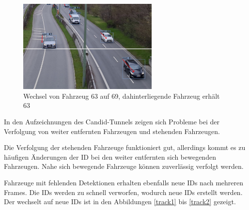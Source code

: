 \documentclass[conference]{IEEEtran}
\begin{document}
	\begin{figure}[!h]
		\begin{center}
			\includegraphics[width=7cm]{Media/switch4.jpg}
			\caption{Wechsel von Fahrzeug 63 auf 69, dahinterliegende Fahrzeug erhält 63}
			\label{track6}
		\end{center}
	\end{figure}
	
	
	In den Aufzeichnungen des Candid-Tunnels zeigen sich Probleme bei der Verfolgung von weiter entfernten Fahrzeugen und stehenden Fahrzeugen.
	
	Die Verfolgung der stehenden Fahrzeuge funktioniert gut, allerdings kommt es zu
	häufigen Änderungen der ID bei den weiter entfernten sich bewegenden Fahrzeugen.
	Nahe sich bewegende Fahrzeuge können zuverlässig verfolgt werden.
	
	Fahrzeuge mit fehlenden Detektionen erhalten ebenfalls neue IDs nach mehreren
	Frames. Die IDs werden zu schnell verworfen, wodurch neue IDs erstellt werden.
	Der wechselt auf neue IDs ist in den Abbildungen \ref{track1} bis \ref{track2} 
	gezeigt.
	
\end{document}
